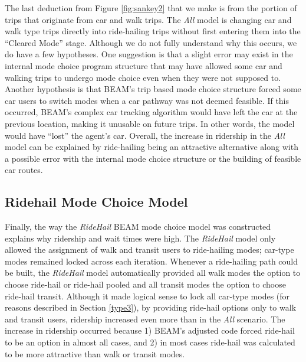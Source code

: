 \documentclass[simple, masters, twoside]{byuthesis}
\begin{document}
The last deduction from Figure \ref{fig:sankey2} that we make is from the portion of trips that originate from car and walk trips. The \emph{All} model is changing car and walk type trips directly into ride-hailing trips without first entering them into the ``Cleared Mode'' stage. Although we do not fully understand why this occurs, we do have a few hypotheses. One suggestion is that a slight error may exist in the internal mode choice program structure that may have allowed some car and walking trips to undergo mode choice even when they were not supposed to. Another hypothesis is that BEAM's trip based mode choice structure forced some car users to switch modes when a car pathway was not deemed feasible. If this occurred, BEAM's complex car tracking algorithm would have left the car at the previous location, making it unusable on future trips. In other words, the model would have ``lost'' the agent's car. Overall, the increase in ridership in the \emph{All} model can be explained by ride-hailing being an attractive alternative along with a possible error with the internal mode choice structure or the building of feasible car routes.

\hypertarget{type2}{%
\subsection{Ridehail Mode Choice Model}\label{type2}}

Finally, the way the \emph{RideHail} BEAM mode choice model was constructed explains why ridership and wait times were high. The \emph{RideHail} model only allowed the assignment of walk and transit users to ride-hailing modes; car-type modes remained locked across each iteration. Whenever a ride-hailing path could be built, the \emph{RideHail} model automatically provided all walk modes the option to choose ride-hail or ride-hail pooled and all transit modes the option to choose ride-hail transit. Although it made logical sense to lock all car-type modes (for reasons described in Section \ref{type3}), by providing ride-hail options only to walk and transit users, ridership increased even more than in the \emph{All} scenario. The increase in ridership occurred because 1) BEAM's adjusted code forced ride-hail to be an option in almost all cases, and 2) in most cases ride-hail was calculated to be more attractive than walk or transit modes.
\end{document}
